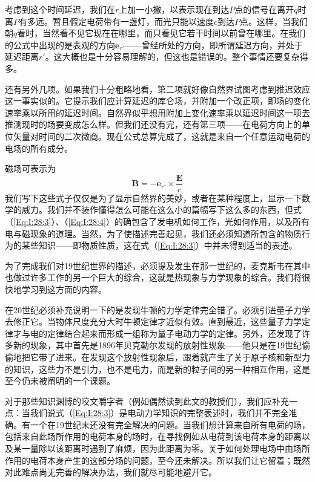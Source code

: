 考虑到这个时间延迟，我们在$r$上加一小撇，以表示现在到达$P$点的信号在离开$q$时离$P$有多远。暂且假定电荷带有一盏灯，而光只能以速度$c$到达$P$点。这样，当我们朝$q$看时，当然看不见它现在在哪里，而只看见它若干时间以前曾在哪里。在我们的公式中出现的是表观的方向$\boldsymbol{e}_{r'}$——曾经所处的方向，即所谓延迟方向，并处于延迟距离$r'$。这大概也是十分容易理解的，但这也是错误的。整个事情还要复杂得多。

还有另外几项。如果我们十分粗略地看，第二项就好像自然界试图考虑到推迟效应这一事实似的。它提示我们应计算延迟的库仑场，并附加一个改正项，即场的变化速率乘以所用的延迟时间。自然界似乎想用附加上变化速率乘以延迟时间这一项去推测现时的场要变成怎么样。但我们还没有完，还有第三项——在电荷方向上的单位矢量对时间的二次微商。现在公式总算完成了，这就是来自一个任意运动电荷的电场的所有成分。

磁场可表示为
\begin{equation}
    \label{Eq:I:28:4}
    \boldsymbol{B} = -\boldsymbol{e}_{r'} \times \frac{\boldsymbol{E}}{c}
\end{equation}
我们写下这些式子仅仅是为了显示自然界的美妙，或者在某种程度上，显示一下数学的威力。我们并不装作懂得怎么可能在这么小的篇幅写下这么多的东西，但式（\ref{Eq:I:28:3}）、（\ref{Eq:I:28:4}）的确包含了发电机如何工作，光如何作用，以及所有电与磁现象的道理。当然，为了使描述完善起见，我们还必须知道所包含的物质行为的某些知识——即物质性质，这在式（\ref{Eq:I:28:3}）中并未得到适当的表述。

为了完成我们对19世纪世界的描述，必须提及发生在那一世纪的，麦克斯韦在其中也做过许多工作的另一个巨大的综合，这就是热现象与力学现象的综合。我们将很快地学习到这方面的内容。

在20世纪必须补充说明一下的是发现牛顿的力学定律完全错了。必须引进量子力学去修正它。当物体尺度充分大时牛顿定律才近似有效。直到最近，这些量子力学定律才与电的定律结合起来而形成一组称为量子电动力学的定律。另外，还发现了许多新的现象，其中首先是1896年贝克勒尔发现的放射性现象——他只是在19世纪偷偷地把它带了进来。在发现这个放射性现象后，跟着就产生了关于原子核和新型力的知识，这些力不是引力，也不是电力，而是新的粒子间的另一种相互作用，这是至今仍未被阐明的一个课题。

对于那些知识渊博的咬文嚼字者（例如偶然读到此文的教授们），我们应补充一点：当我们说式（\ref{Eq:I:28:3}）是电动力学知识的完整表述时，我们并不完全准确。有一个在19世纪末还没有完全解决的问题。当我们想计算来自所有电荷的场，包括来自此场所作用的电荷本身的场时，在寻找例如从电荷到该电荷本身的距离以及某一量除以该距离时遇到了麻烦，因为此距离为零。关于如何处理电场中由场所作用的电荷本身产生的这部分场的问题，至今还未解决。所以我们让它留着；既然对此难点尚无完善的解决办法，我们就尽可能地避开它。

